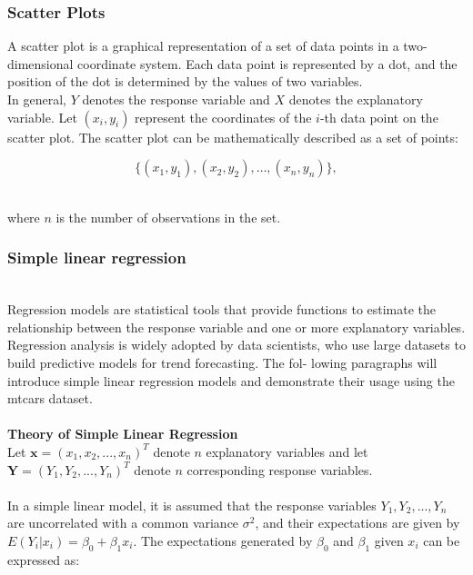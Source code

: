 \documentclass{article}\usepackage[]{graphicx}\usepackage[]{xcolor}
\begin{document}
\subsubsection{Scatter Plots}

A scatter plot is a graphical representation of a set of data points in a two-dimensional coordinate system. Each data point is represented by a dot, and the position of the dot is determined by the values of two variables.\\

\noindent
In general, \(Y\) denotes the response variable and \(X\) denotes the explanatory variable. Let \((x_i, y_i)\) represent the coordinates of the \(i\)-th data point on the scatter plot. The scatter plot can be mathematically described as a set of points:

\[ \{(x_1, y_1), (x_2, y_2), \ldots, (x_n, y_n)\}, \]
  
\\
\noindent where \(n\) is the number of observations in the set.\\


\subsubsection{Simple linear regression}
\\Regression models are statistical tools that provide functions to estimate the relationship between the response variable and one or more explanatory variables. Regression analysis is widely adopted by data scientists, who use large datasets to build predictive models for trend forecasting. The fol- lowing paragraphs will introduce simple linear regression models and demonstrate their usage using the mtcars dataset.
\\  
\\   
\noindent
\textbf{Theory of Simple Linear Regression}
\\Let $\mathbf{x} = (x_1, x_2, ..., x_n)^T$ denote $n$ explanatory variables and let $\mathbf{Y} = (Y_1,Y_2,...,Y_n)^T$ denote $n$ corresponding response variables.
\\  
\\In a simple linear model, it is assumed that the response variables $Y_1,Y_2,...,Y_n$ are uncorrelated with a common variance $\sigma^2$, and their expectations are given by $E(Y_i| x_i) = \beta_0 + \beta_1 x_i$. The expectations generated by $\beta_0$ and $\beta_1$ given $x_i$ can be expressed as:
\end{document}
